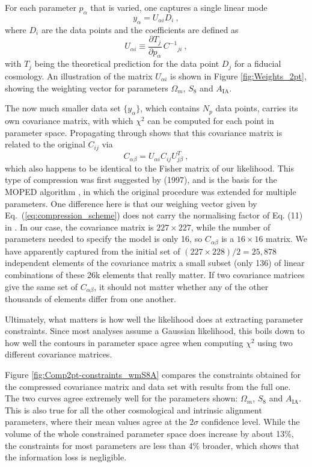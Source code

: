 \documentclass[twocolumn]{\docclass}
\newcommand{\rf}[1]{Figure \ref{fig:#1}}
\newcommand{\ec}[1]{Eq.~(\ref{eq:#1})}
\newcommand\be{\begin{equation}}
\newcommand\ee{\end{equation}}
\newcommand\scott[1]{{\bf [Scott: #1]}}
\begin{document}
	For each parameter $p_\alpha$ that is varied, one captures a single linear mode
	\be
	y_\alpha = U_{\alpha i} D_i\
	,\ee
	where $D_i$ are the data points and the coefficients are defined as
	\be \label{eq:compression_scheme}
	U_{\alpha i} \equiv \frac{\partial T_j}{\partial p_\alpha} \, C^{-1}{}_{ji}\
	,\ee
	with $T_j$ being the theoretical prediction for the data point $D_j$ for a fiducial cosmology. An illustration of the matrix $U_{\alpha i}$ is shown in \rf{Weights_2pt}, showing the weighting vector for parameters $\Omega_m$, $S_8$ and $A_{\mathrm{IA}}$.
	
	The now much smaller data set $\{y_\alpha\}$, which contains $N_p$ data points, carries its own covariance matrix, with which $\chi^2$ can be computed for each point in parameter space. Propagating through shows that this covariance matrix is related to the original $C_{ij}$ via
	\be
	C_{\alpha\beta} = U_{\alpha i} C_{ij} U^T_{j\beta}\ 
	,\ee
	which also happens to be identical to the Fisher matrix of our likelihood. This type of compression was first suggested by \citeauthor{Tegmark:1997maa} (1997), and is the basis for the MOPED algorithm \citep{Heavens:2000hjl}, in which the original procedure was extended for multiple parameters. One difference here is that our weighing vector given by \ec{compression_scheme} does not carry the normalising factor of Eq. (11) in \citep{Heavens:2000hjl}. %
	In our case, the covariance matrix is  $227 \times 227$, while the number of parameters needed to specify the model is only 16, so $C_{\alpha\beta}$ is a $16\times 16$ matrix. We have apparently captured from the initial set of $(227 \times 228)/2 = 25,878$ independent elements of the covariance matrix a small subset (only 136) of linear combinations of these 26k elements that really matter. If two covariance matrices give the same set of $C_{\alpha\beta}$, it should not matter whether any of the other thousands of elements differ from one another.
	
	Ultimately, what matters is how well the likelihood does at extracting parameter constraints. Since most analyses assume a Gaussian likelihood, this boils down to how well the contours in parameter space agree when computing $\chi^2$ using two different covariance matrices.	
	
	\rf{Comp2pt-constraints_wmS8A} compares the constraints obtained for the compressed covariance matrix and data set with results from the full one. The two curves agree extremely well for the parameters shown: $\Omega_m$, $S_8$ and $A_{\mathrm{IA}}$. This is also true for all the other cosmological and intrinsic alignment parameters, where their mean values agree at the $2 \sigma$ confidence level. While the volume of the whole constrained parameter space does increase by about 13\%, the constraints for most parameters are less than 4\% broader, which shows that the information loss is negligible. 
	
\end{document}
